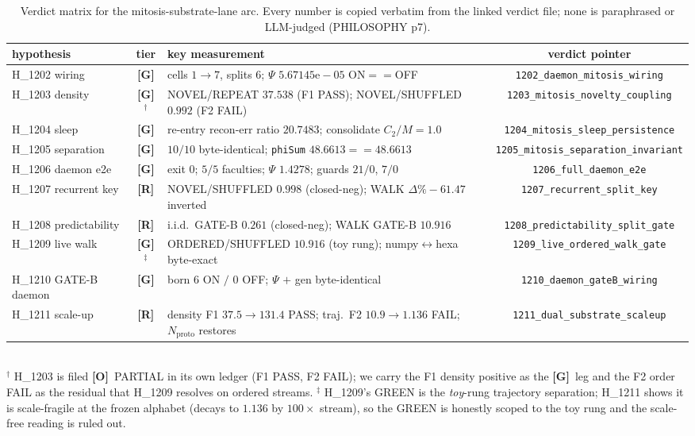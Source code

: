\documentclass[11pt,a4paper]{article}
\providecommand{\tierGreen}{\textbf{[G]}}
\providecommand{\tierOrange}{\textbf{[O]}}
\providecommand{\tierRed}{\textbf{[R]}}
\newcommand{\recon}{\mathrm{recon\text{-}err}}
\begin{document}
\begin{table}[t]
\centering
\caption{Verdict matrix for the mitosis-substrate-lane arc. Every number is
copied verbatim from the linked verdict file; none is paraphrased or
LLM-judged (PHILOSOPHY p7).}
\label{tab:matrix}
\small
\begin{tabular}{p{} c p{} c}
\toprule
hypothesis & tier & key measurement & verdict pointer \\
\midrule
H\_1202 wiring & \tierGreen & cells $1\to7$, splits $6$; $\Psi$ $5.67145\mathrm{e}{-}05$ ON$==$OFF & \texttt{1202\_daemon\_mitosis\_wiring} \\
H\_1203 density & \tierGreen$^\dagger$ & NOVEL/REPEAT $37.538$ (F1 PASS); NOVEL/SHUFFLED $0.992$ (F2 FAIL) & \texttt{1203\_mitosis\_novelty\_coupling} \\
H\_1204 sleep & \tierGreen & re-entry $\recon$ ratio $20.7483$; consolidate $C_2/M=1.0$ & \texttt{1204\_mitosis\_sleep\_persistence} \\
H\_1205 separation & \tierGreen & $10/10$ byte-identical; \texttt{phiSum} $48.6613==48.6613$ & \texttt{1205\_mitosis\_separation\_invariant} \\
H\_1206 daemon e2e & \tierGreen & exit $0$; $5/5$ faculties; $\Psi$ $1.4278$; guards $21/0$, $7/0$ & \texttt{1206\_full\_daemon\_e2e} \\
H\_1207 recurrent key & \tierRed & NOVEL/SHUFFLED $0.998$ (closed-neg); WALK $\Delta\% -61.47$ inverted & \texttt{1207\_recurrent\_split\_key} \\
H\_1208 predictability & \tierRed & i.i.d.\ GATE-B $0.261$ (closed-neg); WALK GATE-B $10.916$ & \texttt{1208\_predictability\_split\_gate} \\
H\_1209 live walk & \tierGreen$^\ddagger$ & ORDERED/SHUFFLED $10.916$ (toy rung); numpy$\leftrightarrow$hexa byte-exact & \texttt{1209\_live\_ordered\_walk\_gate} \\
H\_1210 GATE-B daemon & \tierGreen & born $6$ ON $/$ $0$ OFF; $\Psi$ $+$ gen byte-identical & \texttt{1210\_daemon\_gateB\_wiring} \\
H\_1211 scale-up & \tierRed & density F1 $37.5{\to}131.4$ PASS; traj.\ F2 $10.9{\to}1.136$ FAIL; $N_{\text{proto}}$ restores & \texttt{1211\_dual\_substrate\_scaleup} \\
\bottomrule
\end{tabular}
\\[2pt]
{\footnotesize $^\dagger$ H\_1203 is filed \tierOrange\ PARTIAL in its own ledger
(F1 PASS, F2 FAIL); we carry the F1 density positive as the \tierGreen\ leg and
the F2 order FAIL as the residual that H\_1209 resolves on ordered streams.
$^\ddagger$ H\_1209's GREEN is the \emph{toy}-rung trajectory separation; H\_1211
shows it is scale-fragile at the frozen alphabet (decays to $1.136$ by
$100\times$ stream), so the GREEN is honestly scoped to the toy rung and the
scale-free reading is ruled out.}
\end{table}
\end{document}
